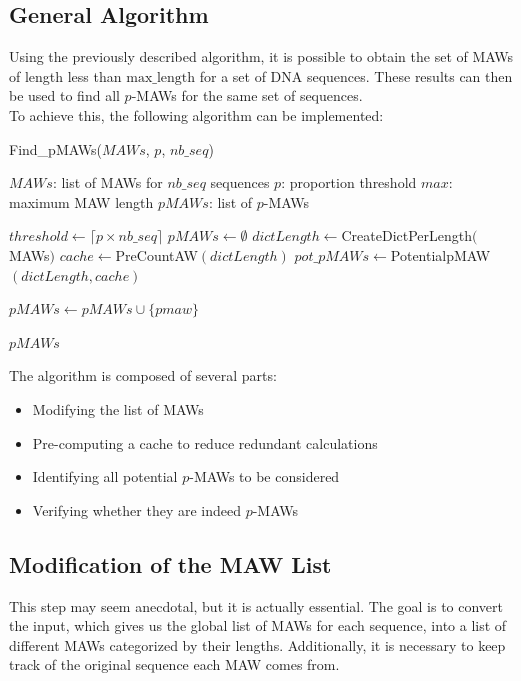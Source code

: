 \documentclass[conference]{IEEEtran}
\begin{document}
\subsection{General Algorithm}
Using the previously described algorithm, it is possible to obtain the set of MAWs of length less than $\text{max\_length}$ for a set of DNA sequences. These results can then be used to find all $p$-MAWs for the same set of sequences.\\
To achieve this, the following algorithm can be implemented:
\begin{algorithm}
\caption{Find\_pMAWs($MAWs$, $p$, $nb\_seq$)}
\begin{algorithmic}[1]
\Require $MAWs$: list of MAWs for $nb\_seq$ sequences
\Require $p$: proportion threshold
\Require $max$: maximum MAW length
\Ensure $pMAWs$: list of $p$-MAWs

\State $threshold \gets \lceil p \times nb\_seq \rceil$
\State $pMAWs \gets \emptyset$
\State $dictLength \gets $CreateDictPerLength$($MAWs$)$
\State $cache \gets $PreCountAW$(dictLength)$
\State $pot\_pMAWs \gets $PotentialpMAW$(dictLength, cache)$

        \State $pMAWs \gets pMAWs \cup \{pmaw\}$
    \EndIf
\EndFor

\State \Return $pMAWs$
\end{algorithmic}
\end{algorithm}
The algorithm is composed of several parts:
\begin{itemize}
    \item Modifying the list of MAWs
    \item Pre-computing a cache to reduce redundant calculations
    \item Identifying all potential $p$-MAWs to be considered
    \item Verifying whether they are indeed $p$-MAWs
\end{itemize}
\subsection{Modification of the MAW List}
This step may seem anecdotal, but it is actually essential. The goal is to convert the input, which gives us the global list of MAWs for each sequence, into a list of different MAWs categorized by their lengths. Additionally, it is necessary to keep track of the original sequence each MAW comes from.\\
\end{document}

